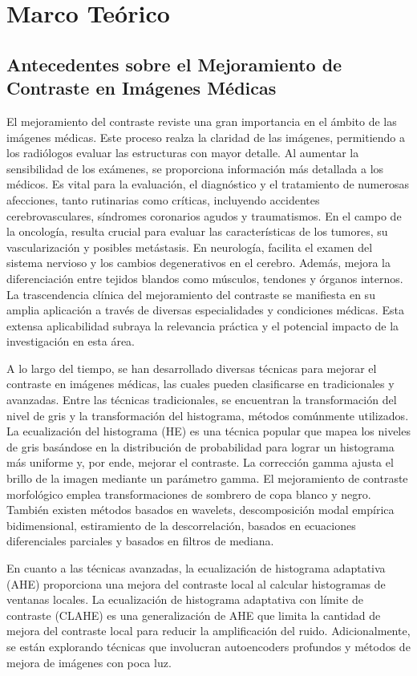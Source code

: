 \chapter{Marco Teórico}

\section{Antecedentes sobre el Mejoramiento de Contraste en Imágenes Médicas}
El mejoramiento del contraste reviste una gran importancia en el ámbito de las imágenes médicas. Este proceso realza la claridad de las imágenes, permitiendo a los radiólogos evaluar las estructuras con mayor detalle. Al aumentar la sensibilidad de los exámenes, se proporciona información más detallada a los médicos. Es vital para la evaluación, el diagnóstico y el tratamiento de numerosas afecciones, tanto rutinarias como críticas, incluyendo accidentes cerebrovasculares, síndromes coronarios agudos y traumatismos. En el campo de la oncología, resulta crucial para evaluar las características de los tumores, su vascularización y posibles metástasis. En neurología, facilita el examen del sistema nervioso y los cambios degenerativos en el cerebro. Además, mejora la diferenciación entre tejidos blandos como músculos, tendones y órganos internos. La trascendencia clínica del mejoramiento del contraste se manifiesta en su amplia aplicación a través de diversas especialidades y condiciones médicas. Esta extensa aplicabilidad subraya la relevancia práctica y el potencial impacto de la investigación en esta área.

A lo largo del tiempo, se han desarrollado diversas técnicas para mejorar el contraste en imágenes médicas, las cuales pueden clasificarse en tradicionales y avanzadas. Entre las técnicas tradicionales, se encuentran la transformación del nivel de gris y la transformación del histograma, métodos comúnmente utilizados. La ecualización del histograma (HE) es una técnica popular que mapea los niveles de gris basándose en la distribución de probabilidad para lograr un histograma más uniforme y, por ende, mejorar el contraste. La corrección gamma ajusta el brillo de la imagen mediante un parámetro gamma. El mejoramiento de contraste morfológico emplea transformaciones de sombrero de copa blanco y negro. También existen métodos basados en wavelets, descomposición modal empírica bidimensional, estiramiento de la descorrelación, basados en ecuaciones diferenciales parciales y basados en filtros de mediana.

En cuanto a las técnicas avanzadas, la ecualización de histograma adaptativa (AHE) proporciona una mejora del contraste local al calcular histogramas de ventanas locales. La ecualización de histograma adaptativa con límite de contraste (CLAHE) es una generalización de AHE que limita la cantidad de mejora del contraste local para reducir la amplificación del ruido. Adicionalmente, se están explorando técnicas que involucran autoencoders profundos y métodos de mejora de imágenes con poca luz.

